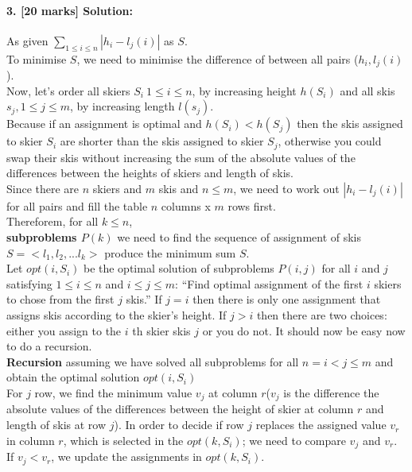 \documentclass[a4paper]{scrartcl}
\begin{document}
\paragraph{3. [20 marks] Solution:}
\label{sec:Question3}
As given $\sum_{1\leq i \leq n} | h_i - l_j(i) | $ as $S$.\\
To minimise $S$, we need to minimise the difference of between all pairs ($h_i, l_j(i)$).\\
Now, let's order all skiers $S_i\ 1\leq i \leq n$, by increasing height $h(S_i)$ and all skis $s_j, 1\leq j \leq m$, by increasing length $l(s_j)$. \\
Because if an assignment is optimal and $h(S_i) < h(S_j)$ then the skis assigned to skier $S_i$ are shorter than the skis assigned to skier $S_j$, otherwise you could swap their skis without increasing the sum of the absolute values of the differences between the heights of skiers and length of skis.\\
Since there are $n$ skiers and $m$ skis and $n\leq m$, we need to work out $|h_i-l_j(i)|$ for all pairs and fill the table $n$ columns x $m$ rows first. \\
Thereforem, for all $k \leq n$,\\
\textbf{subproblems $P(k)$} we need to find the sequence of assignment of skis $S=\big<l_1,l_2,...l_k\big>$ produce the minimum sum $S$.\\
Let $opt(i,S_{i})$ be the optimal solution of subproblems $P(i, j)$ for all $i$ and $j$ satisfying $1 \leq i \leq n$ and $i \leq j \leq m$: “Find optimal assignment of the first $i$ skiers to chose from the first $j$ skis.” If $j = i$ then there is only one assignment that assigns skis according to the skier’s height. If $j > i$ then there are two choices: either you assign to the $i$ th skier skis $j$ or you do not. It should now be easy now to do a recursion.\\
\textbf{Recursion} assuming we have solved all subproblems for all $ n = i < j \leq m$ and obtain the optimal solution $opt(i,S_{i})$\\
For $j$ row, we find the minimum value $v_j$ at column $r$($v_j$ is the difference the absolute values of the differences between the height of skier at column $r$ and length of skis at row $j$). In order to decide if row $j$ replaces the assigned value $v_r$ in column $r$, which is selected in the $opt(k,S_{i})$; we need to compare $v_j$ and $v_r$. If $v_j < v_r$, we update the assignments in $opt(k,S_{i})$.
\end{document}
